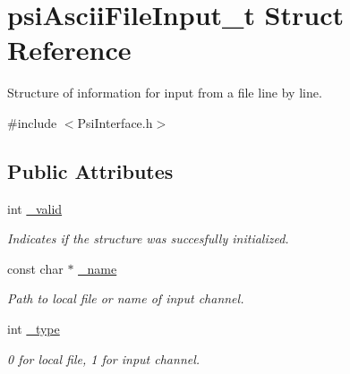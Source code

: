 \hypertarget{structpsiAsciiFileInput__t}{}\section{psi\+Ascii\+File\+Input\+\_\+t Struct Reference}
\label{structpsiAsciiFileInput__t}


Structure of information for input from a file line by line.  




{\ttfamily \#include $<$Psi\+Interface.\+h$>$}

\subsection*{Public Attributes}
\begin{DoxyCompactItemize}
\item 
\mbox{\label{structpsiAsciiFileInput__t_aff62f1ab107455f11afa8639678e9cf8}} 
int \hyperlink{structpsiAsciiFileInput__t_aff62f1ab107455f11afa8639678e9cf8}{\+\_\+valid}
\begin{DoxyCompactList}\small\item\em Indicates if the structure was succesfully initialized. \end{DoxyCompactList}\item 
\mbox{\label{structpsiAsciiFileInput__t_aedbc53e8d193c4f3183bb4568f924d19}} 
const char $\ast$ \hyperlink{structpsiAsciiFileInput__t_aedbc53e8d193c4f3183bb4568f924d19}{\+\_\+name}
\begin{DoxyCompactList}\small\item\em Path to local file or name of input channel. \end{DoxyCompactList}\item 
\mbox{\label{structpsiAsciiFileInput__t_ad438b6a4ccf9870a4fb071c242cd1f9c}} 
int \hyperlink{structpsiAsciiFileInput__t_ad438b6a4ccf9870a4fb071c242cd1f9c}{\+\_\+type}
\begin{DoxyCompactList}\small\item\em 0 for local file, 1 for input channel. \end{DoxyCompactList}\item 
\mbox{\label{structpsiAsciiFileInput__t_a520047f592ec4fe3b51430c9166c4cc2}} 

\end{DoxyCompactItemize}
